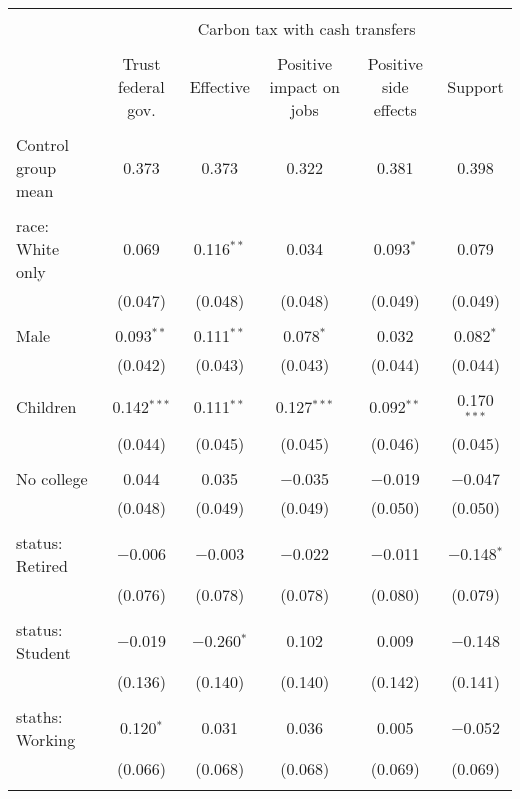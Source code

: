 
\begin{tabular}{@{\extracolsep{5pt}}lccccc} 
\\[-1.8ex]\hline 
\hline \\[-1.8ex] 
 & \multicolumn{5}{c}{Carbon tax with cash transfers} \\ 
\cline{2-6} 
\\[-1.8ex] & Trust federal gov. & Effective & Positive impact on jobs & Positive side effects & Support \\ 
\hline \\[-1.8ex] 
 Control group mean & 0.373 & 0.373 & 0.322 & 0.381 & 0.398  \\ \hline \\[-1.8ex] race: White only & 0.069 & 0.116$^{**}$ & 0.034 & 0.093$^{*}$ & 0.079 \\ 
  & (0.047) & (0.048) & (0.048) & (0.049) & (0.049) \\ 
  & & & & & \\ 
 Male & 0.093$^{**}$ & 0.111$^{**}$ & 0.078$^{*}$ & 0.032 & 0.082$^{*}$ \\ 
  & (0.042) & (0.043) & (0.043) & (0.044) & (0.044) \\ 
  & & & & & \\ 
 Children & 0.142$^{***}$ & 0.111$^{**}$ & 0.127$^{***}$ & 0.092$^{**}$ & 0.170$^{***}$ \\ 
  & (0.044) & (0.045) & (0.045) & (0.046) & (0.045) \\ 
  & & & & & \\ 
 No college & 0.044 & 0.035 & $-$0.035 & $-$0.019 & $-$0.047 \\ 
  & (0.048) & (0.049) & (0.049) & (0.050) & (0.050) \\ 
  & & & & & \\ 
 status: Retired & $-$0.006 & $-$0.003 & $-$0.022 & $-$0.011 & $-$0.148$^{*}$ \\ 
  & (0.076) & (0.078) & (0.078) & (0.080) & (0.079) \\ 
  & & & & & \\ 
 status: Student & $-$0.019 & $-$0.260$^{*}$ & 0.102 & 0.009 & $-$0.148 \\ 
  & (0.136) & (0.140) & (0.140) & (0.142) & (0.141) \\ 
  & & & & & \\ 
 staths: Working & 0.120$^{*}$ & 0.031 & 0.036 & 0.005 & $-$0.052 \\ 
  & (0.066) & (0.068) & (0.068) & (0.069) & (0.069) \\ 
  & & & & & \\ 

\end{tabular}
